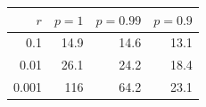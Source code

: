 \begin{tabular}{rrrr}
\toprule
$r$ & $p = 1$ & $p = 0.99$ & $p = 0.9$ \\
\midrule
0.1 & 14.9 & 14.6 & 13.1 \\
0.01 & 26.1 & 24.2 & 18.4 \\
0.001 & 116 & 64.2 & 23.1 \\
\bottomrule
\end{tabular}
